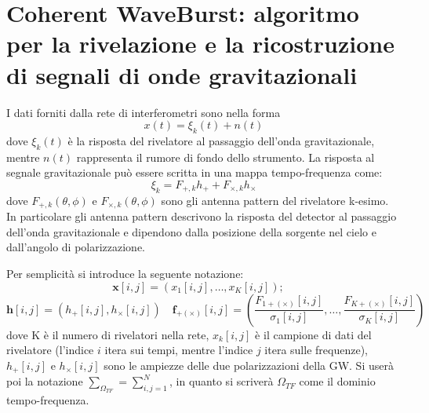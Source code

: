 \chapter[Algoritmo Coherent WaveBurst]{Coherent WaveBurst: algoritmo per la rivelazione e la ricostruzione di segnali di onde gravitazionali}
\label{chapter:cwb}
I dati forniti dalla rete di interferometri sono nella forma 
\[x(t) = \xi_k(t) + n(t)\]
dove $\xi_k(t)$ è la risposta del rivelatore al passaggio dell'onda gravitazionale, mentre $n(t)$ rappresenta il rumore di fondo dello strumento.
La risposta al segnale gravitazionale può essere scritta in una mappa tempo-frequenza come:
\begin{equation}
\xi_k = F_{+,k}h_+ + F_{\times,k}h_\times
\label{eqn:detector_response}
\end{equation}
dove $F_{+,k}(\theta,\phi)$ e $F_{\times,k}(\theta,\phi)$ sono gli antenna pattern del rivelatore k-esimo\cite{Klimenko_2008}. In particolare gli antenna pattern descrivono la risposta del detector al passaggio dell'onda gravitazionale e dipendono dalla posizione della sorgente nel cielo e dall'angolo di polarizzazione. 

Per semplicità si introduce la seguente notazione:
\[
\mathbf{x}[i,j] = \left(x_1[i,j],\dots, x_K[i,j] \right) ;
\quad
\]
\[
\mathbf{h}[i,j] = (h_+[i,j], h_\times[i,j])
\quad
\mathbf{f}_{+(\times)}[i,j] = \left(\frac{F_{1+(\times)}[i,j]}{\sigma_1[i,j]},\dots, \frac{F_{K+(\times)}[i,j]}{\sigma_K[i,j]} \right) 
\]
dove K è il numero di rivelatori nella rete, $x_k[i,j]$ è il campione di dati del rivelatore (l'indice $i$ itera sui tempi, mentre l'indice $j$ itera sulle frequenze)\cite{Klimenko_2008}, $h_{+}[i,j]$ e $h_{\times}[i,j]$ sono le ampiezze delle due polarizzazioni della GW. Si userà poi la notazione $\sum_{\Omega_{TF}} = \sum_{i,j=1}^N$, in quanto si scriverà $\Omega_{TF}$ come il dominio tempo-frequenza.


